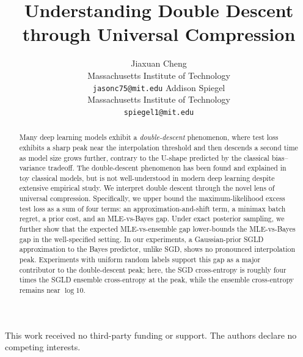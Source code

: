 \documentclass{article}
\title{Understanding Double Descent through Universal Compression}
\author{%
  Jiaxuan Cheng\\
  Massachusetts Institute of Technology\\
  \texttt{jasonc75@mit.edu}
  \And
  Addison Spiegel\\
  Massachusetts Institute of Technology\\
  \texttt{spiegel1@mit.edu}
}
\begin{document}
\maketitle


\begin{abstract}
  Many deep learning models exhibit a \emph{double-descent} phenomenon,
  where test loss exhibits a sharp peak near the interpolation threshold and
  then descends a second time as model size grows further, contrary to the
  U-shape predicted by the classical bias--variance tradeoff. The
  double-descent phenomenon has been found and explained in toy classical
  models, but is not well-understood in modern deep learning despite
  extensive empirical study. We interpret double
  descent through the novel lens of universal compression. Specifically, we
  upper bound the maximum-likelihood excess test loss as a sum of four terms: an
  approximation-and-shift term, a minimax batch regret, a prior cost, and an
  MLE-vs-Bayes gap. Under exact posterior sampling, we further show that the expected
  MLE-vs-ensemble gap lower-bounds the MLE-vs-Bayes gap in the well-specified
  setting. In our experiments, a Gaussian-prior SGLD approximation
  to the Bayes predictor, unlike SGD, shows no pronounced interpolation
  peak. Experiments with uniform random labels support this gap as a
  major contributor to the double-descent peak; here, the SGD cross-entropy is
  roughly four times the SGLD ensemble cross-entropy at the peak, while
  the ensemble cross-entropy remains near $\log 10$.

\end{abstract}













\begin{ack}
This work received no third-party funding or support.
The authors declare no competing interests.
\end{ack}

\small





\appendix




\clearpage

\end{document}
